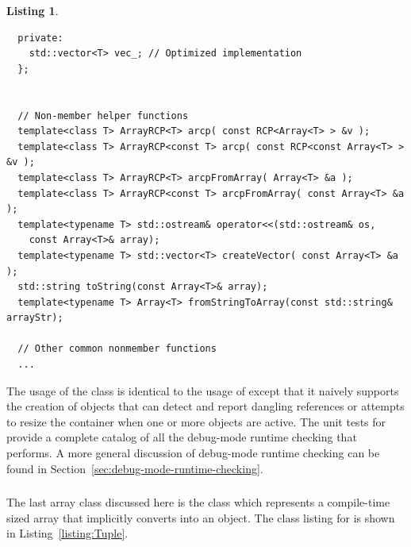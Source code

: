 \documentclass[pdf,ps2pdf,11pt]{SANDreport}
\newtheorem{listing}{Listing}
\begin{document}
\begin{listing}
{\begin{verbatim}
  private:
    std::vector<T> vec_; // Optimized implementation
  };
  
  
  // Non-member helper functions
  template<class T> ArrayRCP<T> arcp( const RCP<Array<T> > &v );
  template<class T> ArrayRCP<const T> arcp( const RCP<const Array<T> > &v );
  template<class T> ArrayRCP<T> arcpFromArray( Array<T> &a );
  template<class T> ArrayRCP<const T> arcpFromArray( const Array<T> &a );
  template<typename T> std::ostream& operator<<(std::ostream& os,
    const Array<T>& array);
  template<typename T> std::vector<T> createVector( const Array<T> &a );
  std::string toString(const Array<T>& array);
  template<typename T> Array<T> fromStringToArray(const std::string& arrayStr);

  // Other common nonmember functions
  ...
\end{verbatim}}
\end{listing}

The usage of the {} class is identical to the usage of
{} except that it naively supports the creation of
{} objects that can detect and report dangling
references or attempts to resize the container when one or more
{} objects are active.  The unit tests for
{} provide a complete catalog of all the debug-mode runtime
checking that {} performs.  A more general discussion of
debug-mode runtime checking can be found in
Section~\ref{sec:debug-mode-runtime-checking}.


%
{}\subsubsection{}
%

The last array class discussed here is the {} class which
represents a compile-time sized array that implicitly converts into an
{} object.  The class listing for {} is
shown in Listing~\ref{listing:Tuple}.
\end{document}
